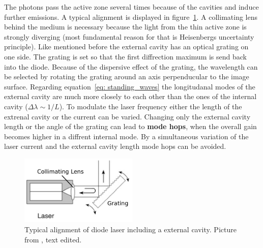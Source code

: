 The photons pass the active zone several times because of the cavities and induce further emissions. A typical alignment is displayed in figure~\ref{fig: cavity}.
A collimating lens behind the medium is necessary because the light from the thin active zone is strongly diverging (most 
fundamental reason for that is Heisenbergs uncertainty principle).
Like mentioned before the external cavity has an optical grating on one side. The grating is set so that the first diffrection maximum is send back into the
diode. Because of the dispersive effect of the grating, the wavelength can be selected by rotating the grating around an axis perpenducular
to the image surface. Regarding equation~\eqref{eq: standing_waves} the longitudanal modes of the external cavity are much
more closely to each other than the ones of the internal cavity ($\Delta \lambda \sim 1 / L$).
To modulate the laser frequency either the length of the extrenal cavity or the current can be varied.
Changing only the external cavity length or the angle of the grating can lead to \textbf{mode hops}, when the overall gain becomes higher
in a diffrent internal mode. By a simultaneous variation of the laser current and the external cavity length mode hops can be avoided.

\begin{figure}
  \centering
  \includegraphics[width = 0.5\textwidth]{pics/cavity.pdf}
  \caption{Typical alignment of diode laser including a external cavity. 
  Picture from \cite{eichler}, text edited.}
  \label{fig: cavity}
\end{figure}
